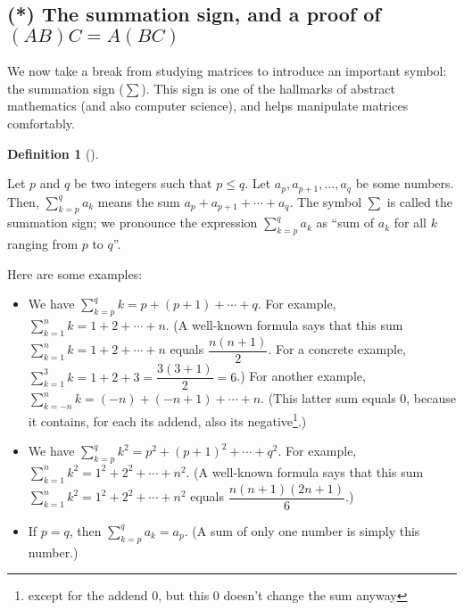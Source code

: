 \documentclass[numbers=enddot,12pt,final,onecolumn,notitlepage]{scrartcl}%
\theoremstyle{definition}
\newtheorem{defi}[theo]{Definition}
\newenvironment{definition}[1][]
{\begin{defi}[#1]\begin{leftbar}}
{\end{leftbar}\end{defi}}
\let\sumnonlimits\sum
\renewcommand{\sum}{\sumnonlimits\limits}
\begin{document}
\subsection{\label{sect.intro.sum}(*) The summation sign, and a proof of
$\left(  AB\right)  C=A\left(  BC\right)  $}

We now take a break from studying matrices to introduce an important symbol:
the summation sign ($\sum$). This sign is one of the hallmarks of abstract
mathematics (and also computer science), and helps manipulate matrices comfortably.

\begin{definition}
\label{def.sum}Let $p$ and $q$ be two integers such that $p\leq q$. Let
$a_{p},a_{p+1},\ldots,a_{q}$ be some numbers. Then, $\sum_{k=p}^{q}a_{k}$
means the sum $a_{p}+a_{p+1}+\cdots+a_{q}$. The symbol $\sum$ is called the
summation sign; we pronounce the expression $\sum_{k=p}^{q}a_{k}$ as
\textquotedblleft sum of $a_{k}$ for all $k$ ranging from $p$ to
$q$\textquotedblright.
\end{definition}

Here are some examples:

\begin{itemize}
\item We have $\sum_{k=p}^{q}k=p+\left(  p+1\right)  +\cdots+q$. For example,
$\sum_{k=1}^{n}k=1+2+\cdots+n$. (A well-known formula says that this sum
$\sum_{k=1}^{n}k=1+2+\cdots+n$ equals $\dfrac{n\left(  n+1\right)  }{2}$. For
a concrete example, $\sum_{k=1}^{3}k=1+2+3=\dfrac{3\left(  3+1\right)  }{2}%
=6$.) For another example, $\sum_{k=-n}^{n}k=\left(  -n\right)  +\left(
-n+1\right)  +\cdots+n$. (This latter sum equals $0$, because it contains, for
each its addend, also its negative\footnote{except for the addend $0$, but
this $0$ doesn't change the sum anyway}.)

\item We have $\sum_{k=p}^{q}k^{2}=p^{2}+\left(  p+1\right)  ^{2}+\cdots
+q^{2}$. For example, $\sum_{k=1}^{n}k^{2}=1^{2}+2^{2}+\cdots+n^{2}$. (A
well-known formula says that this sum $\sum_{k=1}^{n}k^{2}=1^{2}+2^{2}%
+\cdots+n^{2}$ equals $\dfrac{n\left(  n+1\right)  \left(  2n+1\right)  }{6}$.)

\item If $p=q$, then $\sum_{k=p}^{q}a_{k}=a_{p}$. (A sum of only one number is
simply this number.)
\end{itemize}
\end{document}

